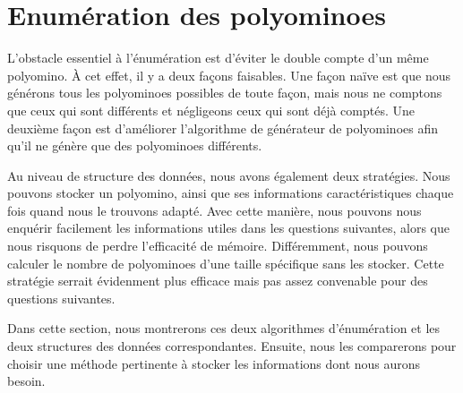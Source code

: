\documentclass[a4paper,12pt]{article}
\begin{document}
	\section{Enumération des polyominoes}
	\par L'obstacle essentiel à l'énumération est d'éviter le double compte d'un même polyomino. À cet effet, il y a deux façons faisables. Une façon naïve est que nous générons tous les polyominoes possibles de toute façon, mais nous ne comptons que ceux qui sont différents et négligeons ceux qui sont déjà comptés. Une deuxième façon est d'améliorer l'algorithme de générateur de polyominoes afin qu'il ne génère que des polyominoes différents.
	\par Au niveau de structure des données, nous avons également deux stratégies. Nous pouvons stocker un polyomino, ainsi que ses informations caractéristiques chaque fois quand nous le trouvons adapté. Avec cette manière, nous pouvons nous enquérir facilement les informations utiles dans les questions suivantes, alors que nous risquons de perdre l'efficacité de mémoire. Différemment, nous pouvons calculer le nombre de polyominoes d'une taille spécifique sans les stocker. Cette stratégie serrait évidenment plus efficace mais pas assez convenable pour des questions suivantes.
	\par Dans cette section, nous montrerons ces deux algorithmes d'énumération et les deux structures des données correspondantes. Ensuite, nous les comparerons pour choisir une méthode pertinente à stocker les informations dont nous aurons besoin.
\end{document}
